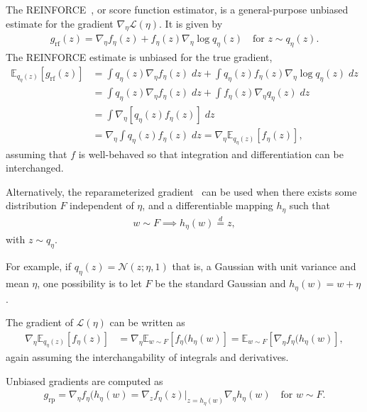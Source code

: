 \documentclass[12pt]{article}
\newcommand{\Expect}{\mathbb{E}}
\begin{document}
The REINFORCE~\cite{Williams1992reinforce}, or score function estimator, is a general-purpose unbiased estimate for the gradient $\nabla_\eta \mathcal{L}(\eta)$. It is given by 
\begin{align}
    g_{\textrm{rf}}(z) = \nabla_\eta f_\eta(z) + 
            f_\eta(z)  \nabla_\eta \log q_\eta(z)
    \quad \text{for } 
    z\sim q_\eta(z). 
\end{align}
The REINFORCE estimate is unbiased for the true gradient, \begin{align}
    \Expect_{q_\eta(z)}[g_{\textrm{rf}}(z)] &= 
    \int q_\eta(z) \nabla_\eta f_\eta(z) \; dz+ 
    \int q_\eta(z) f_\eta(z)  \nabla_\eta \log q_\eta(z)\; dz \\
    &= \int q_\eta(z) \nabla_\eta f_\eta(z) \; dz+ 
    \int f_\eta(z) \nabla_\eta q_\eta(z)  \; dz \\
    &= \int \nabla_\eta[q_\eta(z) f_\eta(z)] \; dz \\
    &= \nabla_\eta \int q_\eta(z) f_\eta(z) \; dz 
    = \nabla_\eta \Expect_{q_\eta(z)}[f_\eta(z)],
\end{align}
assuming that $f$ is well-behaved so that integration and differentiation can be interchanged. 

Alternatively, the reparameterized gradient~\cite{rezende2014stochastic, kingma2013autoencoding} can be used when there exists some distribution $F$ independent of $\eta$, and a differentiable mapping $h_\eta$ such that 
\begin{align}
    w \sim F \implies h_\eta(w) \stackrel{d}{=} z,
\end{align}
with $z\sim q_\eta$. 

For example, if $q_{\eta}(z) = \mathcal{N}(z; \eta, 1)$ that is, a Gaussian with unit variance and mean $\eta$, one possibility is to let $F$ be the standard Gaussian and $h_\eta(w) = w + \eta$. 

The gradient of $\mathcal{L}(\eta)$ can be written as 
\begin{align}
    \nabla_\eta \Expect_{q_\eta(z)}[f_\eta(z)] &= 
        \nabla_\eta \Expect_{w\sim F}[f_\eta(h_\eta(w)] = \Expect_{w\sim F}[\nabla_\eta f_\eta(h_\eta(w)], 
\end{align}
again assuming the interchangability of integrals and derivatives. 

Unbiased gradients are computed as 
\begin{align}
    g_{\textrm{rp}} 
    = \nabla_\eta f_\eta(h_\eta(w)
    = \nabla_z f_\eta(z)\Big|_{z = h_\eta(w)}
    \nabla_\eta h_\eta(w) \quad \text{for } w\sim F. 
\end{align}
\end{document}
